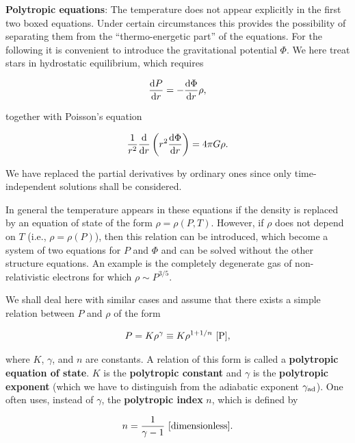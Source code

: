 \documentclass[a4paper,10pt]{article}
\begin{document}
{\noindent}\textbf{Polytropic equations}: The temperature does not appear explicitly in the first two boxed equations. Under certain circumstances this provides the possibility of separating them from the ``thermo-energetic part'' of the equations. For the following it is convenient to introduce the gravitational potential $\Phi$. We here treat stars in hydrostatic equilibrium, which requires

\begin{align*}
    \frac{{\rm d}P}{{\rm d}r} = - \frac{{\rm d}\Phi}{{\rm d}r} \rho,
\end{align*}

{\noindent}together with Poisson's equation

\begin{align*}
    \frac{1}{r^2}\frac{{\rm d}}{{\rm d}r} \left(r^2\frac{{\rm d}\Phi}{{\rm d}r}\right) = 4\pi G\rho.
\end{align*}

{\noindent}We have replaced the partial derivatives by ordinary ones since only time-independent solutions shall be considered.

{\noindent}In general the temperature appears in these equations if the density is replaced by an equation of state of the form $\rho=\rho(P,T)$. However, if $\rho$ does not depend on $T$ (i.e., $\rho=\rho(P)$), then this relation can be introduced, which become a system of two equations for $P$ and $\Phi$ and can be solved without the other structure equations. An example is the completely degenerate gas of non-relativistic electrons for which $\rho\sim P^{3/5}$.

{\noindent}We shall deal here with similar cases and assume that there exists a simple relation between $P$ and $\rho$ of the form

\begin{align*}
    P = K\rho^\gamma \equiv K\rho^{1+1/n} ~ [{\rm P}],
\end{align*}

{\noindent}where $K$, $\gamma$, and $n$ are constants. A relation of this form is called a \textbf{polytropic equation of state}. $K$ is the \textbf{polytropic constant} and $\gamma$ is the \textbf{polytropic exponent} (which we have to distinguish from the adiabatic exponent $\gamma_{\rm ad}$). One often uses, instead of $\gamma$, the \textbf{polytropic index} $n$, which is defined by

\begin{align*}
    n = \frac{1}{\gamma-1} ~ [{\rm dimensionless}].
\end{align*}
\end{document}
